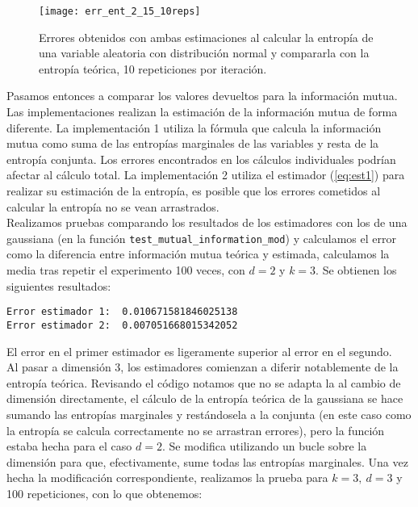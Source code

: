 \documentclass[12pt,a4paper]{report} %
\theoremstyle{definition}
\begin{document}
\begin{figure}[H]
    \centering
    \texttt{[image: err\_ent\_2\_15\_10reps]}
    \caption{Errores obtenidos con ambas estimaciones al calcular la entropía de una variable aleatoria con distribución normal y compararla con la entropía teórica, 10 repeticiones por iteración.}
    \label{fig:err_ent15}
\end{figure}

Pasamos entonces a comparar los valores devueltos para la información mutua. Las implementaciones realizan la estimación de la información mutua de forma diferente. La implementación 1 utiliza la fórmula que calcula la información mutua como suma de las entropías marginales de las variables y resta de la entropía conjunta. Los errores encontrados en los cálculos individuales podrían afectar al cálculo total. La implementación 2 utiliza el estimador (\ref{eq:est1}) para realizar su estimación de la entropía, es posible que los errores cometidos al calcular la entropía no se vean arrastrados.\\

Realizamos pruebas comparando los resultados de los estimadores con los de una gaussiana (en la función \texttt{test\_mutual\_information\_mod}) y calculamos el error como la diferencia entre información mutua teórica y estimada, calculamos la media tras repetir el experimento 100 veces, con $d=2$ y $k=3$. Se obtienen los siguientes resultados:\\

\begin{lstlisting}
Error estimador 1:  0.010671581846025138
Error estimador 2:  0.007051668015342052

\end{lstlisting}

El error en el primer estimador es ligeramente superior al error en el segundo.\\

Al pasar a dimensión 3, los estimadores comienzan a diferir notablemente de la entropía teórica. Revisando el código notamos que no se adapta la al cambio de dimensión directamente, el cálculo de la entropía teórica de la gaussiana se hace sumando las entropías marginales y restándosela a la conjunta (en este caso como la entropía se calcula correctamente no se arrastran errores), pero la función estaba hecha para el caso $d = 2$. Se modifica utilizando un bucle sobre la dimensión para que, efectivamente, sume todas las entropías marginales. Una vez hecha la modificación correspondiente, realizamos la prueba para $k = 3,\ d = 3$ y 100 repeticiones, con lo que obtenemos:\\
\end{document}
